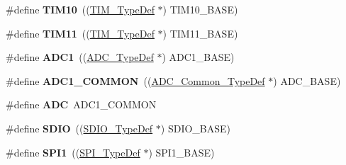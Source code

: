 \begin{DoxyCompactItemize}
\item 
\hypertarget{group___peripheral__declaration_ga46b2ad3f5f506f0f8df0d2ec3e767267}{\#define {\bfseries T\-I\-M10}~((\hyperlink{struct_t_i_m___type_def}{T\-I\-M\-\_\-\-Type\-Def} $\ast$) T\-I\-M10\-\_\-\-B\-A\-S\-E)}\label{group___peripheral__declaration_ga46b2ad3f5f506f0f8df0d2ec3e767267}

\item 
\hypertarget{group___peripheral__declaration_gacfd11ef966c7165f57e2cebe0abc71ad}{\#define {\bfseries T\-I\-M11}~((\hyperlink{struct_t_i_m___type_def}{T\-I\-M\-\_\-\-Type\-Def} $\ast$) T\-I\-M11\-\_\-\-B\-A\-S\-E)}\label{group___peripheral__declaration_gacfd11ef966c7165f57e2cebe0abc71ad}

\item 
\hypertarget{group___peripheral__declaration_ga90d2d5c526ce5c0a551f533eccbee71a}{\#define {\bfseries A\-D\-C1}~((\hyperlink{struct_a_d_c___type_def}{A\-D\-C\-\_\-\-Type\-Def} $\ast$) A\-D\-C1\-\_\-\-B\-A\-S\-E)}\label{group___peripheral__declaration_ga90d2d5c526ce5c0a551f533eccbee71a}

\item 
\hypertarget{group___peripheral__declaration_gaf1919c64fc774aab31190346fd5457e2}{\#define {\bfseries A\-D\-C1\-\_\-\-C\-O\-M\-M\-O\-N}~((\hyperlink{struct_a_d_c___common___type_def}{A\-D\-C\-\_\-\-Common\-\_\-\-Type\-Def} $\ast$) A\-D\-C\-\_\-\-B\-A\-S\-E)}\label{group___peripheral__declaration_gaf1919c64fc774aab31190346fd5457e2}

\item 
\hypertarget{group___peripheral__declaration_ga54d148b91f3d356713f7e367a2243bea}{\#define {\bfseries A\-D\-C}~A\-D\-C1\-\_\-\-C\-O\-M\-M\-O\-N}\label{group___peripheral__declaration_ga54d148b91f3d356713f7e367a2243bea}

\item 
\hypertarget{group___peripheral__declaration_ga8149aa2760fffac16bc75216d5fd9331}{\#define {\bfseries S\-D\-I\-O}~((\hyperlink{struct_s_d_i_o___type_def}{S\-D\-I\-O\-\_\-\-Type\-Def} $\ast$) S\-D\-I\-O\-\_\-\-B\-A\-S\-E)}\label{group___peripheral__declaration_ga8149aa2760fffac16bc75216d5fd9331}

\item 
\hypertarget{group___peripheral__declaration_gad483be344a28ac800be8f03654a9612f}{\#define {\bfseries S\-P\-I1}~((\hyperlink{struct_s_p_i___type_def}{S\-P\-I\-\_\-\-Type\-Def} $\ast$) S\-P\-I1\-\_\-\-B\-A\-S\-E)}\label{group___peripheral__declaration_gad483be344a28ac800be8f03654a9612f}


\end{DoxyCompactItemize}
